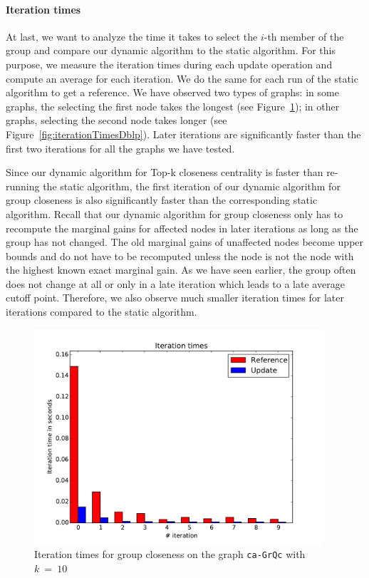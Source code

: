 \paragraph{Iteration times}
At last, we want to analyze the time it takes to select the $i$-th member of the group and compare our dynamic algorithm to the static algorithm. For this purpose, we measure the iteration times during each update operation and compute an average for each iteration. We do the same for each run of the static algorithm to get a reference.  We have observed two types of graphs: in some graphs, the selecting the first node takes the longest (see Figure~\ref{fig:iterationTimesCaGrQc}); in other graphs, selecting the second node takes longer (see Figure~\ref{fig:iterationTimesDblp}). Later iterations are significantly faster than the first two iterations for all the graphs we have tested.

Since our dynamic algorithm for Top-k closeness centrality is faster than re-running the static algorithm, the first iteration of our dynamic algorithm for group closeness is also significantly faster than the corresponding static algorithm. Recall that our dynamic algorithm for group closeness only has to recompute the marginal gains for affected nodes in later iterations as long as the group has not changed. The old marginal gains of unaffected nodes become upper bounds and do not have to be recomputed unless the node is not the node with the highest known exact marginal gain. As we have seen earlier, the group often does not change at all or only in a late iteration which leads to a late average cutoff point. Therefore, we also observe much smaller iteration times for later iterations compared to the static algorithm.


\begin{figure}[h!]
	\includegraphics[width=0.95\textwidth]{figures/iterations_ca-GrQc_10}
	\caption{Iteration times for group closeness on the graph \texttt{ca-GrQc} with $k~=~10$}
	\label{fig:iterationTimesCaGrQc}
\end{figure}

